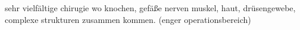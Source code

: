 sehr vielfältige chirugie wo knochen, gefäße nerven muskel, haut, drüsengewebe, complexe strukturen zusammen kommen. (enger operationsbereich)